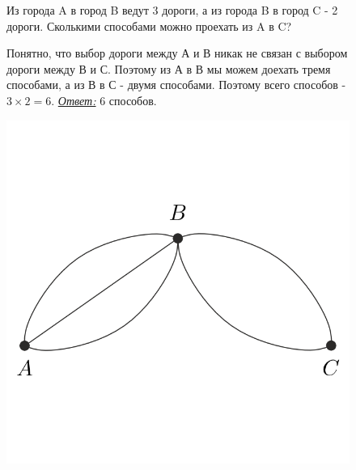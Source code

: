 \begin{figure}[!h]
\begin{minipage}{0.84\linewidth}\setlength{\parindent}{1.5em}
\begin{thm}
	Из города A в город B ведут 3 дороги, а из города B в город C - 2 дороги. Сколькими способами можно проехать из A в C? 
\end{thm}
\begin{prf} Понятно, что выбор дороги между А и В никак не связан с выбором дороги между В и С. Поэтому из А в В мы можем доехать тремя способами, а из В в С - двумя способами. Поэтому всего способов - $3 \times 2 = 6$. \underline{\textit{Ответ:}} 6 способов.\footnotemark
\end{prf}
\end{minipage}
\begin{minipage}{0.15\linewidth}
    \includegraphics[width=0.9\columnwidth]{./img/ways}
\end{minipage}
\end{figure}

